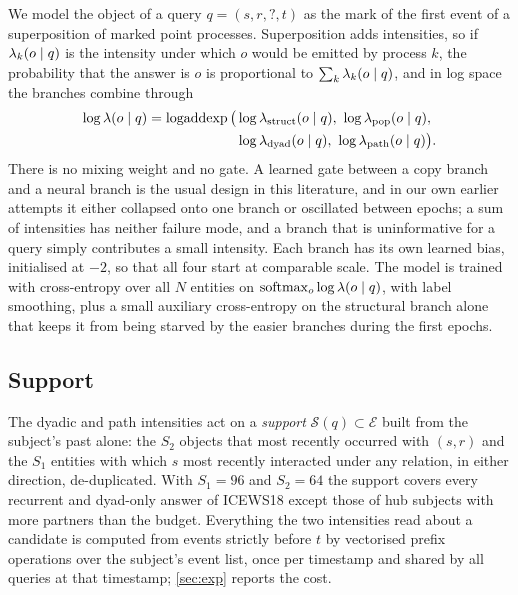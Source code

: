 We model the object of a query $q = (s, r, ?, t)$ as the mark of the first event of a superposition of marked point processes. Superposition adds intensities, so if $\lambda_k(o \mid q)$ is the intensity under which $o$ would be emitted by process $k$, the probability that the answer is $o$ is proportional to $\sum_k \lambda_k(o \mid q)$, and in log space the branches combine through
\begin{equation}
  \begin{aligned}
  \log \lam(o \mid q) = \operatorname{logaddexp}\big(&\log\lam_{\text{struct}}(o \mid q),\ \log\lam_{\text{pop}}(o \mid q),\\
                                                      &\log\lam_{\text{dyad}}(o \mid q),\ \log\lam_{\text{path}}(o \mid q)\big).
  \end{aligned}
  \label{eq:super}
\end{equation}
There is no mixing weight and no gate. A learned gate between a copy branch and a neural branch is the usual design in this literature, and in our own earlier attempts it either collapsed onto one branch or oscillated between epochs; a sum of intensities has neither failure mode, and a branch that is uninformative for a query simply contributes a small intensity. Each branch has its own learned bias, initialised at $-2$, so that all four start at comparable scale. The model is trained with cross-entropy over all $N$ entities on $\operatorname{softmax}_o \log\lambda(o \mid q)$, with label smoothing, plus a small auxiliary cross-entropy on the structural branch alone that keeps it from being starved by the easier branches during the first epochs.

\subsection{Support}

The dyadic and path intensities act on a \emph{support} $\mathcal{S}(q) \subset \mathcal{E}$ built from the subject's past alone: the $S_2$ objects that most recently occurred with $(s, r)$ and the $S_1$ entities with which $s$ most recently interacted under any relation, in either direction, de-duplicated. With $S_1 = 96$ and $S_2 = 64$ the support covers every recurrent and dyad-only answer of ICEWS18 except those of hub subjects with more partners than the budget. Everything the two intensities read about a candidate is computed from events strictly before $t$ by vectorised prefix operations over the subject's event list, once per timestamp and shared by all queries at that timestamp; \cref{sec:exp} reports the cost.

